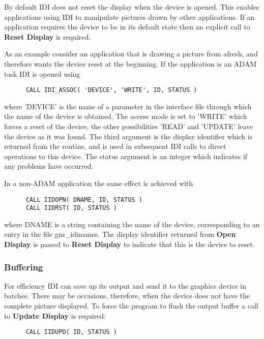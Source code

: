 By default IDI does not reset the display when the device is opened.
This enables applications using IDI to manipulate pictures drawn by
other applications. If an application requires the device to be in its
default state then an explicit call to {\bf Reset Display} is required.

As an example consider an application that is drawing a picture from
afresh, and therefore wants the device reset at the beginning. If the
application is an ADAM task IDI is opened using
\begin{small}
\begin{verbatim}
      CALL IDI_ASSOC( 'DEVICE', 'WRITE', ID, STATUS )
\end{verbatim}
\end{small}
where 'DEVICE' is the name of a parameter in the interface file
through which the name of the device is obtained. The access mode
is set to 'WRITE' which forces a reset of the device, the other
possibilities 'READ' and 'UPDATE' leave the device as it was found.
The third argument is the display identifier which is returned from
the routine, and is used in subsequent IDI calls to direct operations
to this device. The status argument is an integer which indicates if
any problems have occurred.

In a non-ADAM application the same effect is achieved with
\begin{small}
\begin{verbatim}
      CALL IIDOPN( DNAME, ID, STATUS )
      CALL IIDRST( ID, STATUS )
\end{verbatim}
\end{small}
where DNAME is a string containing the name of the device, corresponding
to an entry in the file gns\_idinames. The display identifier returned
from {\bf Open Display} is passed to {\bf Reset Display} to indicate
that this is the device to reset.

\subsubsection{Buffering}

For efficiency IDI can save up its output and send it to the graphics
device in batches. There may be occasions, therefore, when the device does
not have the complete picture displayed. To force the program to flush the
output buffer a call to {\bf Update Display} is required:
\begin{small}
\begin{verbatim}
      CALL IIDUPD( ID, STATUS )
\end{verbatim}
\end{small}

